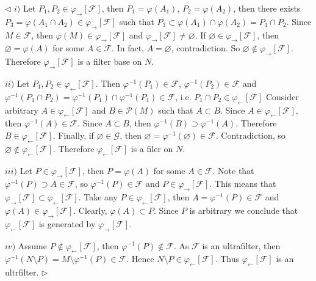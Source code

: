 \documentclass[12pt]{article}
\newenvironment{proof}{\par $\triangleleft$}{$\triangleright$}
\begin{document}
\begin{proof} $i)$ Let $P_1,P_2\in\varphi_{\rightarrow}[\mathcal{F}]$, then $P_1=\varphi(A_1)$, $P_2=\varphi(A_2)$, then there exists $P_3=\varphi(A_1\cap A_2)\in\varphi_{\rightarrow}[\mathcal{F}]$ such that $P_3\subset\varphi(A_1)\cap\varphi(A_2)=P_1\cap P_2$. Since $M\in\mathcal{F}$, then $\varphi(M)\in\varphi_{\rightarrow}[\mathcal{F}]$ and $\varphi_{\rightarrow}[\mathcal{F}]\neq\varnothing$. If $\varnothing\in\varphi_{\rightarrow}[\mathcal{F}]$, then $\varnothing=\varphi(A)$ for some $A\in\mathcal{F}$. In fact, $A=\varnothing$, contradiction. So $\varnothing\notin\varphi_{\rightarrow}[\mathcal{F}]$. Therefore $\varphi_{\rightarrow}[\mathcal{F}]$ is a filter base on $N$.

$ii)$ Let $P_1,P_2\in\varphi_{\leftarrow}[\mathcal{F}]$. Then $\varphi^{-1}(P_1)\in\mathcal{F}$, $\varphi^{-1}(P_2)\in\mathcal{F}$ and $\varphi^{-1}(P_1\cap P_2)=\varphi^{-1}(P_1)\cap\varphi^{-1}(P_1)\in\mathcal{F}$, i.e. $P_1\cap P_2\in\varphi_{\leftarrow}[\mathcal{F}]$ Consider arbitrary $A\in\varphi_{\leftarrow}[\mathcal{F}]$ and $B\in\mathcal{P}(M)$ such that $A\subset B$. Since $A\in\varphi_{\leftarrow}[\mathcal{F}]$, then $\varphi^{-1}(A)\in\mathcal{F}$. Since $A\subset B$, then $\varphi^{-1}(B)\supset\varphi^{-1}(A)$. Therefore $B\in\varphi_{\leftarrow}[\mathcal{F}]$. Finally, if $\varnothing\in\mathcal{G}$, then $\varnothing=\varphi^{-1}(\varnothing)\in\mathcal{F}$. Contradiction, so $\varnothing\notin\varphi_{\leftarrow}[\mathcal{F}]$. Therefore $\varphi_{\leftarrow}[\mathcal{F}]$ is a filer on $N$.

$iii)$ Let $P\in\varphi_{\rightarrow}[\mathcal{F}]$, then $P=\varphi(A)$ for some $A\in\mathcal{F}$. Note that $\varphi^{-1}(P)\supset A\in\mathcal{F}$, so $\varphi^{-1}(P)\in\mathcal{F}$ and $P\in\varphi_{\rightarrow}[\mathcal{F}]$. This means that $\varphi_{\rightarrow}[\mathcal{F}]\subset \varphi_{\leftarrow}[\mathcal{F}]$. Take any $P\in \varphi_{\leftarrow}[\mathcal{F}]$, then $A=\varphi^{-1}(P)\in\mathcal{F}$ and $\varphi(A)\in\varphi_{\rightarrow}[\mathcal{F}]$. Clearly, $\varphi(A)\subset P$. Since $P$ is arbitrary we conclude that $\varphi_{\leftarrow}[\mathcal{F}]$ is generated by $\varphi_{\rightarrow}[\mathcal{F}]$.

$iv)$ Assume $P\notin\varphi_{\leftarrow}[\mathcal{F}]$, then $\varphi^{-1}(P)\notin\mathcal{F}$. As $\mathcal{F}$ is an ultrafilter, then $\varphi^{-1}(N\setminus P)=M\setminus\varphi^{-1}(P)\in\mathcal{F}$. Hence $N\setminus P\in\varphi_{\leftarrow}[\mathcal{F}]$. Thus $\varphi_{\leftarrow}[\mathcal{F}]$ is an ultrfilter.
\end{proof}
\end{document}
